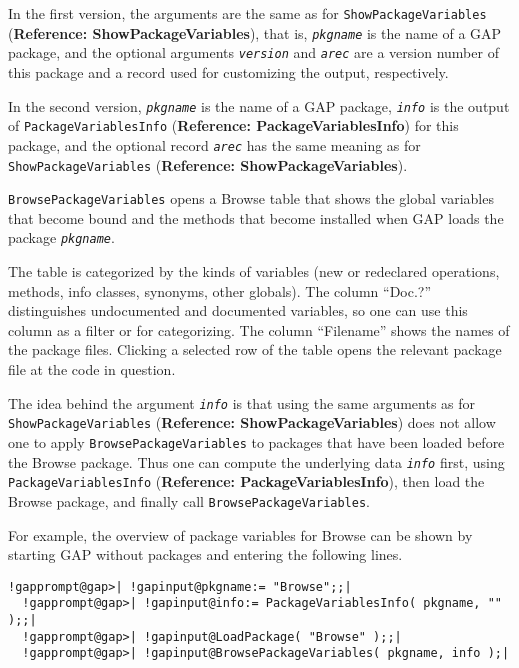 \documentclass[a4paper,11pt]{report}
\begin{document}
{{{ In the first version, the arguments are the same as for \texttt{ShowPackageVariables} (\textbf{Reference: ShowPackageVariables}), that is, \mbox{\texttt{\mdseries\slshape pkgname}} is the name of a \textsf{GAP} package, and the optional arguments \mbox{\texttt{\mdseries\slshape version}} and \mbox{\texttt{\mdseries\slshape arec}} are a version number of this package and a record used for customizing the
output, respectively. 

 In the second version, \mbox{\texttt{\mdseries\slshape pkgname}} is the name of a \textsf{GAP} package, \mbox{\texttt{\mdseries\slshape info}} is the output of \texttt{PackageVariablesInfo} (\textbf{Reference: PackageVariablesInfo}) for this package, and the optional record \mbox{\texttt{\mdseries\slshape arec}} has the same meaning as for \texttt{ShowPackageVariables} (\textbf{Reference: ShowPackageVariables}). 

 \texttt{BrowsePackageVariables} opens a Browse table that shows the global variables that become bound and the
methods that become installed when \textsf{GAP} loads the package \mbox{\texttt{\mdseries\slshape pkgname}}. 

 The table is categorized by the kinds of variables (new or redeclared
operations, methods, info classes, synonyms, other globals). The column ``Doc.?'' distinguishes undocumented and documented variables, so one can use this
column as a filter or for categorizing. The column ``Filename'' shows the names of the package files. Clicking a selected row of the table
opens the relevant package file at the code in question. 

 The idea behind the argument \mbox{\texttt{\mdseries\slshape info}} is that using the same arguments as for \texttt{ShowPackageVariables} (\textbf{Reference: ShowPackageVariables}) does not allow one to apply \texttt{BrowsePackageVariables} to packages that have been loaded before the \textsf{Browse} package. Thus one can compute the underlying data \mbox{\texttt{\mdseries\slshape info}} first, using \texttt{PackageVariablesInfo} (\textbf{Reference: PackageVariablesInfo}), then load the \textsf{Browse} package, and finally call \texttt{BrowsePackageVariables}. 

 For example, the overview of package variables for \textsf{Browse} can be shown by starting \textsf{GAP} without packages and entering the following lines. 

 
\begin{Verbatim}[commandchars=!@|,fontsize=\small,frame=single,label=Example]
  !gapprompt@gap>| !gapinput@pkgname:= "Browse";;|
  !gapprompt@gap>| !gapinput@info:= PackageVariablesInfo( pkgname, "" );;|
  !gapprompt@gap>| !gapinput@LoadPackage( "Browse" );;|
  !gapprompt@gap>| !gapinput@BrowsePackageVariables( pkgname, info );|
\end{Verbatim}
 }

}}
\end{document}
